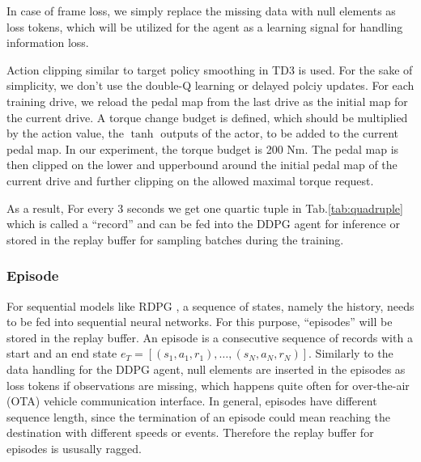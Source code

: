 \documentclass[conference]{IEEEtran}
\begin{document}
\begin{description}
	\item[Loss tokens]
        \item In case of frame loss, we simply replace the missing data with null elements as loss tokens, which will be utilized for the agent as a learning signal for handling information loss.

	\item[Action clipping]
        \item Action clipping similar to target policy smoothing in TD3 \parencite{TD3:_addres_funct_approx_error_actor_critic_method} is used. For the sake of simplicity, we don't use the double-Q learning or delayed polciy updates. For each training drive, we reload the pedal map from the last drive as the initial map for the current drive. A torque change budget is defined, which should be multiplied by the action value, the $\tanh$ outputs of the actor, to be added to the current pedal map. In our experiment, the torque budget is 200 Nm. The pedal map is then clipped on the lower and upperbound around the initial pedal map of the current drive and further clipping on the allowed maximal torque request.

\end{description}

As a result, For every 3 seconds we get one quartic tuple in Tab.\@\ref{tab:quadruple} which is called a ``record'' and can be fed into the DDPG agent for inference or stored in the replay buffer for sampling batches during the training.

\subsubsection{Episode}\label{sec:episode}

For sequential models like RDPG \parencite{heess15:_memor}, a sequence of states, namely the history, needs to be fed into sequential neural networks. For this purpose, ``episodes'' will be stored in the replay buffer. An episode is a consecutive sequence of records with a start and an end state $e_T=[(s_1,a_1,r_1),\ldots,(s_{N},a_{N},r_{N})]$. Similarly to the data handling for the DDPG agent, null elements are inserted in the episodes as loss tokens if observations are missing, which happens quite often for over-the-air (OTA) vehicle communication interface. In general, episodes have different sequence length, since the termination of an episode could mean reaching the destination with different speeds or events. Therefore the replay buffer for episodes is ususally ragged.
\end{document}
